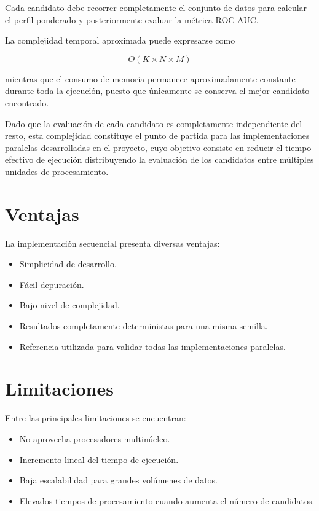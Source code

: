 Cada candidato debe recorrer completamente el conjunto de datos para calcular el perfil ponderado y posteriormente evaluar la métrica ROC-AUC.

La complejidad temporal aproximada puede expresarse como

\[
O(K \times N \times M)
\]

mientras que el consumo de memoria permanece aproximadamente constante durante toda la ejecución, puesto que únicamente se conserva el mejor candidato encontrado.

Dado que la evaluación de cada candidato es completamente independiente del resto, esta complejidad constituye el punto de partida para las implementaciones paralelas desarrolladas en el proyecto, cuyo objetivo consiste en reducir el tiempo efectivo de ejecución distribuyendo la evaluación de los candidatos entre múltiples unidades de procesamiento.

\section{Ventajas}

La implementación secuencial presenta diversas ventajas:

\begin{itemize}

\item Simplicidad de desarrollo.

\item Fácil depuración.

\item Bajo nivel de complejidad.

\item Resultados completamente deterministas para una misma semilla.

\item Referencia utilizada para validar todas las implementaciones paralelas.

\end{itemize}

\section{Limitaciones}

Entre las principales limitaciones se encuentran:

\begin{itemize}

\item No aprovecha procesadores multinúcleo.

\item Incremento lineal del tiempo de ejecución.

\item Baja escalabilidad para grandes volúmenes de datos.

\item Elevados tiempos de procesamiento cuando aumenta el número de candidatos.

\end{itemize}

